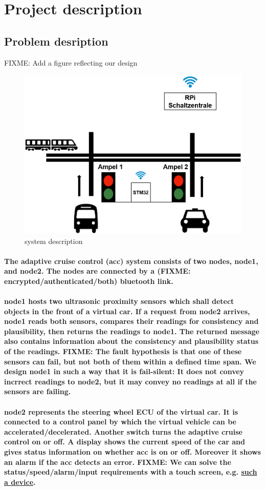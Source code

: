 \section{Project description}
\label{chapter1}

\subsection{Problem desription}

FIXME: Add a figure reflecting our design

\begin{figure}[h]
	\includegraphics[height=50mm;left=50mm]{images/system}
	\centering
	\caption{system description}
	\label{fig:system}
\end{figure}

\paragraph
{
The adaptive cruise control (acc) system consists of two nodes, node1, and node2. The nodes are connected
by a (FIXME: encrypted/authenticated/both) bluetooth link.
}

\paragraph
{
	node1 hosts two ultrasonic proximity sensors which shall detect objects in the front of a virtual car. If
	a request from node2 arrives, node1 reads both sensors, compares their readings for consistency and plausibility,
	then returns the readings to node1. The returned message also contains information about the consistency and
	plausibility status of the readings.
	FIXME: The fault hypothesis is that one of these sensors can fail, but not both of them within a defined
	time span. We design node1 in such a way that it is fail-silent: It does not convey incrrect readings to node2,
	but it may convey no readings at all if the sensors are failing.
}

\paragraph
{
	node2 represents the steering wheel ECU of the virtual car. It is connected to a control panel by which the virtual 
	vehicle can be accelerated/decelerated. Another switch turns the adaptive cruise control on or off.
	A display shows the current speed of the car and gives status information on whether acc is on or off.
	Moreover it shows an alarm if the acc detects an error.
	FIXME: We can solve the status/speed/alarm/input requirements with a touch screen, e.g. 
	\href{https://www.berrybase.de/3-5-ips-display-fuer-raspberry-pi-mit-resistivem-touchscreen} {such a device}.
}

